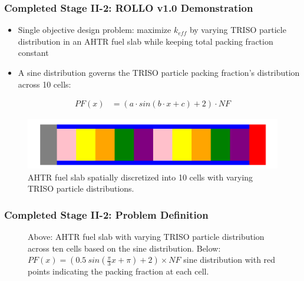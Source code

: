 \begin{frame}
    \frametitle{Completed Stage II-2: ROLLO v1.0 Demonstration}
    \begin{itemize}
        \item Single objective design problem: maximize $k_{eff}$ by varying 
        TRISO particle distribution in an AHTR fuel slab while keeping total 
        packing fraction constant
        \item A sine distribution governs the TRISO particle packing fraction's 
        distribution across 10 cells:
    \end{itemize}
    \begin{align*}
        PF(x) &= \left(a\cdot sin(b\cdot x + c) + 2\right) \cdot NF
    \end{align*}
    \begin{figure}[]
        \includegraphics[width=0.6\linewidth]{../docs/figures/straightened_slab_mg.png}
        \caption{AHTR fuel slab spatially discretized into 10 cells with varying 
        TRISO particle distributions.}
    \end{figure}
\end{frame}

\begin{frame}
    \frametitle{Completed Stage II-2: Problem Definition}
    \begin{figure}[]
        \centering
        \caption{Above: AHTR fuel slab with varying TRISO particle 
        distribution across ten cells based on the sine distribution. 
        Below: $PF(x) = (0.5\ sin(\frac{\pi}{3}x + \pi) + 2)  \times NF$ 
        sine distribution with red points indicating the packing fraction at each cell.}
    \end{figure}
\end{frame}

